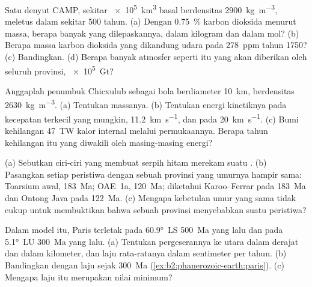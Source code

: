 \begin{exercise}[$\star\star$]\label{exo:b2:phanerozoic-earth:6}
Satu denyut CAMP, sekitar \qty{e5}{km^3} basal berdensitas \qty{2900}{kg.m^{-3}},
meletus dalam sekitar 500 tahun. (a) Dengan \qty{0.75}{\percent} karbon dioksida menurut massa, berapa banyak
yang dilepaskannya, dalam kilogram dan dalam mol? (b) Berapa massa karbon dioksida yang dikandung udara pada
\qty{278}{ppm} tahun 1750? (c) Bandingkan. (d) Berapa banyak atmosfer seperti itu yang akan diberikan oleh seluruh provinsi,
\qty{e5}{Gt}?
\end{exercise}

\begin{exercise}[$\star\star$]\label{exo:b2:phanerozoic-earth:7}
Anggaplah penumbuk Chicxulub sebagai bola berdiameter \qty{10}{km}, berdensitas
\qty{2630}{kg.m^{-3}}. (a) Tentukan massanya. (b) Tentukan energi kinetiknya pada kecepatan terkecil yang mungkin,
\qty{11.2}{km.s^{-1}}, dan pada \qty{20}{km.s^{-1}}. (c) Bumi kehilangan \qty{47}{TW} kalor
internal melalui permukaannya. Berapa tahun kehilangan itu yang diwakili oleh masing-masing energi?
\end{exercise}

\begin{exercise}[$\star\star$]\label{exo:b2:phanerozoic-earth:8}
(a) Sebutkan ciri-ciri yang membuat serpih hitam merekam suatu . (b) Pasangkan setiap
peristiwa dengan sebuah provinsi yang umurnya hampir sama: Toarsium awal, \qty{183}{Ma}; OAE~1a,
\qty{120}{Ma}; diketahui Karoo--Ferrar pada \qty{183}{Ma} dan Ontong Java pada \qty{122}{Ma}. (c) Mengapa
kebetulan umur yang sama tidak cukup untuk membuktikan bahwa sebuah provinsi menyebabkan suatu peristiwa?
\end{exercise}

\begin{exercise}[$\star\star$]\label{exo:b2:phanerozoic-earth:9}
Dalam model itu, Paris terletak pada \ang{60.9}~LS \qty{500}{Ma} yang lalu dan pada \ang{5.1}~LU \qty{300}{Ma} yang lalu.
(a) Tentukan pergeserannya ke utara dalam derajat dan dalam kilometer, dan laju rata-ratanya dalam
sentimeter per tahun. (b) Bandingkan dengan laju sejak \qty{300}{Ma}
(\cref{ex:b2:phanerozoic-earth:paris}). (c) Mengapa laju itu merupakan nilai minimum?
\end{exercise}

